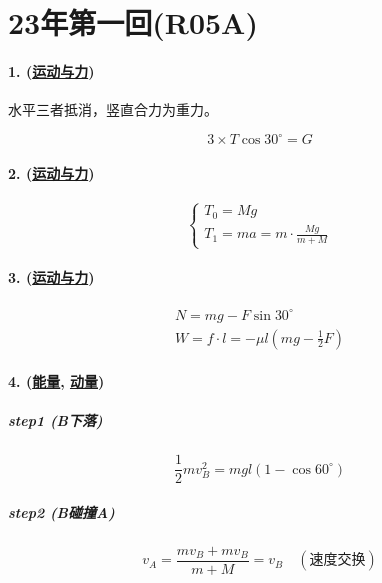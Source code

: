 
\section{23年第一回(R05A)}

\paragraph{1. (\hyperref[subsec:运动与力]{运动与力})} 水平三者抵消，竖直合力为重力。

\begin{equation*}
    3\times T\cos30^\circ=G
\end{equation*}

\paragraph{2. (\hyperref[subsec:运动与力]{运动与力})}

\begin{equation*}
    \begin{cases}
        T_0=Mg\\
        T_1=ma=m\cdot\frac{Mg}{m+M}
    \end{cases}
\end{equation*}

\paragraph{3. (\hyperref[subsec:运动与力]{运动与力})}

\begin{gather*}
    N=mg-F\sin30^\circ\\
    W=f\cdot l=-\mu l(mg-\frac12F)
\end{gather*}

\paragraph{4. (\hyperref[subsec:能量]{能量}, \hyperref[subsec:动量]{动量})}

\subparagraph{step1 (B下落)}

\begin{equation*}
    \frac12mv_B^2=mgl(1-\cos60^\circ)
\end{equation*}

\subparagraph{step2 (B碰撞A)}

\begin{equation*}
    v_A=\frac{mv_B+mv_B}{m+M}=v_B\quad(\text{速度交换})
\end{equation*}

